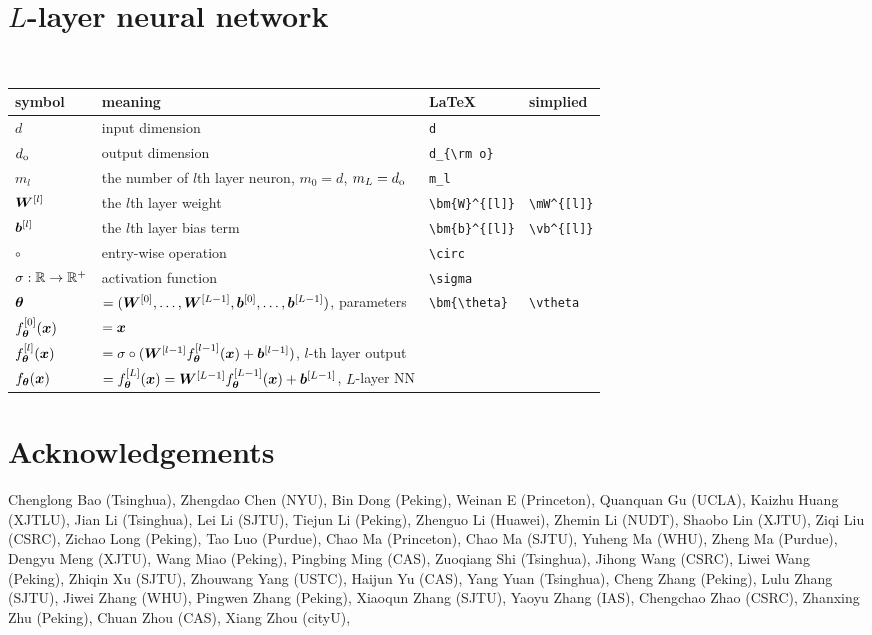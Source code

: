 \documentclass[]{article}
\begin{document}
\section{$L$-layer neural network}~\\
\begin{center}
    \begin{tabular}{llll}
        \toprule
        symbol & meaning & \LaTeX & simplied\\
        \midrule
        $d$ & input dimension & \verb!d! &  \\
        $d_{\rm o}$ & output dimension &\verb!d_{\rm o}! &  \\
        $m_l$& the number of $l$th layer neuron, $m_0=d$, $m_{L} = d_{\rm o}$&\verb!m_l!\\
        $\bm{W}^{[l]}$ & the $l$th layer weight &\verb!\bm{W}^{[l]}!&\verb!\mW^{[l]}!\\
        $\bm{b}^{[l]}$ & the $l$th layer bias term&\verb!\bm{b}^{[l]}!&\verb!\vb^{[l]}!\\
        $\circ$&entry-wise operation&\verb!\circ!\\
        $\sigma:\mathbb{R}\to\mathbb{R}^+$& activation function &\verb!\sigma!\\
        $\bm{\theta}$&$=(\bm{W}^{[0]},\ldots,\bm{W}^{[L-1]},\bm{b}^{[0]},\ldots,\bm{b}^{[L-1]})$,  parameters&\verb!\bm{\theta}!&\verb!\vtheta!\\
        $f_{\bm{\theta}}^{[0]}(\bm{x})$&$=\bm{x}$\\
        $f_{\bm{\theta}}^{[l]}(\bm{x})$&$=\sigma\circ(\bm{W}^{[l-1]} f_{\bm{\theta}}^{[l-1]}(\bm{x}) + \bm{b}^{[l-1]})$,  $l$-th  layer output \\
         $f_{\bm{\theta}}(\bm{x})$&$=f_{\bm{\theta}}^{[L]}(\bm{x})=\bm{W}^{[L-1]} f_{\bm{\theta}}^{[L-1]}(\bm{x}) + \bm{b}^{[L-1]}$,  $L$-layer NN\\
        \bottomrule
    \end{tabular}
\end{center}

\newpage
\section{Acknowledgements}
Chenglong Bao (Tsinghua), Zhengdao Chen (NYU), Bin Dong (Peking), Weinan E (Princeton),  Quanquan Gu (UCLA), Kaizhu Huang (XJTLU), Jian Li (Tsinghua), Lei Li (SJTU), Tiejun Li (Peking),   Zhenguo Li (Huawei), Zhemin Li (NUDT), Shaobo Lin (XJTU), Ziqi Liu (CSRC),  Zichao Long (Peking), Tao Luo (Purdue), Chao Ma (Princeton),  Chao Ma (SJTU), Yuheng Ma (WHU),  Zheng Ma (Purdue),   Dengyu Meng (XJTU), Wang Miao (Peking),  Pingbing Ming (CAS), Zuoqiang Shi (Tsinghua), Jihong Wang (CSRC), Liwei Wang (Peking), Zhiqin Xu (SJTU), Zhouwang Yang (USTC),  Haijun Yu (CAS),  Yang Yuan  (Tsinghua),  Cheng Zhang (Peking),  Lulu Zhang (SJTU), Jiwei Zhang  (WHU),   Pingwen Zhang (Peking), Xiaoqun Zhang (SJTU), Yaoyu Zhang (IAS),  Chengchao Zhao (CSRC), Zhanxing Zhu (Peking), Chuan Zhou (CAS),  Xiang Zhou (cityU),  
\end{document}

